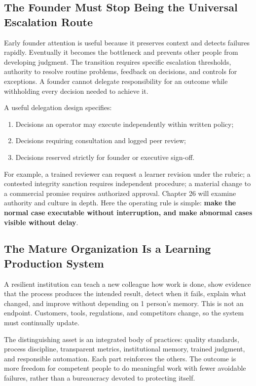 \subsection{The Founder Must Stop Being the Universal Escalation Route}
\label{sec:stop_universal_escalation}

Early founder attention is useful because it preserves context and detects failures rapidly. Eventually it becomes the bottleneck and prevents other people from developing judgment. The transition requires specific escalation thresholds, authority to resolve routine problems, feedback on decisions, and controls for exceptions. A founder cannot delegate responsibility for an outcome while withholding every decision needed to achieve it.

A useful delegation design specifies:
\begin{enumerate}
    \item Decisions an operator may execute independently within written policy;
    \item Decisions requiring consultation and logged peer review;
    \item Decisions reserved strictly for founder or executive sign-off.
\end{enumerate}

For example, a trained reviewer can request a learner revision under the rubric; a contested integrity sanction requires independent procedure; a material change to a commercial promise requires authorized approval. Chapter 26 will examine authority and culture in depth. Here the operating rule is simple: \textbf{make the normal case executable without interruption, and make abnormal cases visible without delay}.

\subsection{The Mature Organization Is a Learning Production System}
\label{sec:learning_production_system}

A resilient institution can teach a new colleague how work is done, show evidence that the process produces the intended result, detect when it fails, explain what changed, and improve without depending on 1 person's memory. This is not an endpoint. Customers, tools, regulations, and competitors change, so the system must continually update.

The distinguishing asset is an integrated body of practices: quality standards, process discipline, transparent metrics, institutional memory, trained judgment, and responsible automation. Each part reinforces the others. The outcome is more freedom for competent people to do meaningful work with fewer avoidable failures, rather than a bureaucracy devoted to protecting itself.
